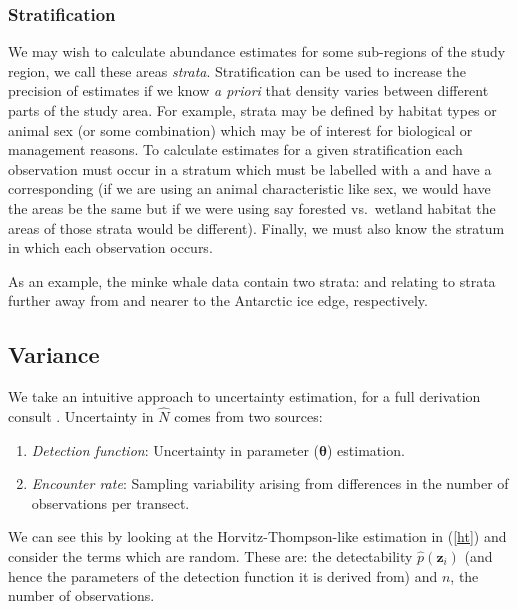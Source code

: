\documentclass[article]{jss}
\providecommand{\tightlist}{%
  \setlength{\itemsep}{0pt}\setlength{\parskip}{0pt}}
\begin{document}
\subsubsection{Stratification}\label{stratification}

We may wish to calculate abundance estimates for some sub-regions of the
study region, we call these areas \emph{strata}. Stratification can be
used to increase the precision of estimates if we know \emph{a priori}
that density varies between different parts of the study area. For
example, strata may be defined by habitat types or animal sex (or some
combination) which may be of interest for biological or management
reasons. To calculate estimates for a given stratification each
observation must occur in a stratum which must be labelled with a
 and have a corresponding  (if we are
using an animal characteristic like sex, we would have the areas be the
same but if we were using say forested vs.~wetland habitat the areas of
those strata would be different). Finally, we must also know the stratum
in which each observation occurs.

As an example, the minke whale data contain two strata:  and
 relating to strata further away from and nearer to the
Antarctic ice edge, respectively.

\subsection{Variance}\label{variance}

We take an intuitive approach to uncertainty estimation, for a full
derivation consult \citet{Marques:2003vb}. Uncertainty in \(\hat{N}\)
comes from two sources:

\begin{enumerate}
\def\labelenumi{\arabic{enumi}.}
\tightlist
\item
  \emph{Detection function}: Uncertainty in parameter
  (\(\boldsymbol{\theta}\)) estimation.
\item
  \emph{Encounter rate}: Sampling variability arising from differences
  in the number of observations per transect.
\end{enumerate}

We can see this by looking at the Horvitz-Thompson-like estimation in
(\ref{ht}) and consider the terms which are random. These are: the
detectability \(\hat{p}(\mathbf{z}_i)\) (and hence the parameters of the
detection function it is derived from) and \(n\), the number of
observations.
\end{document}
